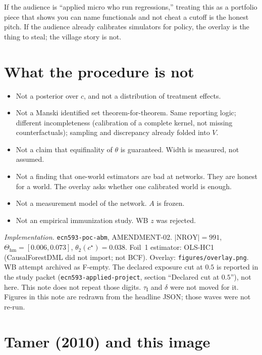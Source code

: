 \documentclass[11pt]{article}
\newcommand{\NROY}{\mathrm{NROY}}
\newcommand{\hm}{\mathrm{hm}}
\newcommand{\thr}{\tau_{\mathrm{I}}}
\begin{document}
If the audience is ``applied micro who run regressions,'' treating this
as a portfolio piece that shows you can name functionals and not cheat
a cutoff is the honest pitch. If the audience already calibrates
simulators for policy, the overlay is the thing to steal; the village
story is not.

\section{What the procedure is not}

\begin{itemize}
  \item Not a posterior over $c$, and not a distribution of treatment
        effects.
  \item Not a Manski identified set theorem-for-theorem. Same reporting
        logic; different incompleteness (calibration of a complete
        kernel, not missing counterfactuals); sampling and discrepancy
        already folded into $V$.
  \item Not a claim that equifinality of $\theta$ is guaranteed.
        Width is measured, not assumed.
  \item Not a finding that one-world estimators are bad at networks.
        They are honest for a world. The overlay asks whether one
        calibrated world is enough.
  \item Not a measurement model of the network. $A$ is frozen.
  \item Not an empirical immunization study. WB $z$ was rejected.
\end{itemize}

\vspace{1.2em}
{\small
\noindent\textit{Implementation.}
\texttt{ecn593-poc-abm}, AMENDMENT-02.
$|\NROY|=991$,
$\Theta_{\hm}=[0.006,0.073]$,
$\theta_2(c^\star)=0.038$.
Foil~1 estimator: OLS-HC1 (CausalForestDML did not import; not BCF).
Overlay: \texttt{figures/overlay.png}.
WB attempt archived as F-empty.
The declared exposure cut at $0.5$ is reported in the study packet
(\texttt{ecn593-applied-project}, section ``Declared cut at $0.5$''),
not here. This note does not repeat those digits. $\thr$ and $\delta$
were not moved for it.
Figures in this note are redrawn from the headline JSON; those waves
were not re-run.
}

\appendix
\section{Tamer (2010) and this image}
\label{sec:tamer}
\end{document}
